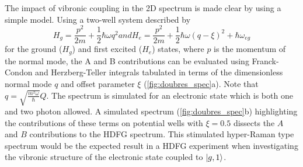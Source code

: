 \documentclass[aip, jcp, reprint, onecolumn]{revtex4-2}
\begin{document}
The impact of vibronic coupling in the 2D spectrum is made clear by using a simple model. \cite{Kundu2022}
Using a two-well system described by 
\begin{subequations}
	\begin{equation}
		H_g = \frac{p^2}{2m} + \frac{1}{2} \hbar \omega q^2
	\end{equation}
and
	\begin{equation}
		H_e = \frac{p^2}{2m} + \frac{1}{2} \hbar \omega (q-\xi)^2 +\hbar \omega_{eg}
	\end{equation}
\end{subequations}
for the ground ($H_g$) and first excited ($H_e$) states, where $p$ is the momentum of the normal mode, the A and B contributions can be evaluated using Franck-Condon and Herzberg-Teller integrals tabulated in terms of the dimensionless normal mode $q$ and offset parameter $\xi$ (\autoref{fig:doubres_spec}a). \cite{Carlson1988thesis} 
Note that $q = \sqrt{\frac{m^2\omega}{\hbar}} Q$.
The spectrum is simulated for an electronic state which is both one and two photon allowed.
A simulated spectrum (\autoref{fig:doubres_spec}b) highlighting the contributions of these terms on potential wells with $\xi = 0.5$ dissects the $A$ and $B$ contributions to the HDFG spectrum.
This stimulated hyper-Raman type spectrum would be the expected result in a HDFG experiment when investigating the vibronic structure of the electronic state coupled to $\ket{g,1}$.
\end{document}
